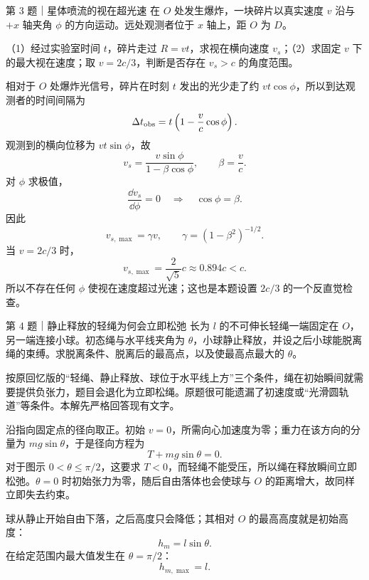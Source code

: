 \begin{problem}{第 3 题｜星体喷流的视在超光速}
在 $O$ 处发生爆炸，一块碎片以真实速度 $v$ 沿与 $+x$ 轴夹角 $\phi$ 的方向运动。远处观测者位于 $x$ 轴上，距 $O$ 为 $D$。

（1）经过实验室时间 $t$，碎片走过 $R=vt$，求视在横向速度 $v_s$；（2）求固定 $v$ 下的最大视在速度；取 $v=2c/3$，判断是否存在 $v_s>c$ 的角度范围。
\FigSuperluminal
\end{problem}
\begin{solution}
相对于 $O$ 处爆炸光信号，碎片在时刻 $t$ 发出的光少走了约 $vt\cos\phi$，所以到达观测者的时间间隔为
\[
\Delta t_{\rm obs}=t\left(1-\frac vc\cos\phi\right).
\]
观测到的横向位移为 $vt\sin\phi$，故
\[
\boxed{v_s=\frac{v\sin\phi}{1-\beta\cos\phi}},
\qquad \beta=\frac vc.
\]
对 $\phi$ 求极值，
\[
\frac{\dd v_s}{\dd\phi}=0
\quad\Longrightarrow\quad
\cos\phi=\beta.
\]
因此
\[
\boxed{v_{s,\max}=\gamma v},
\qquad \gamma=(1-\beta^2)^{-1/2}.
\]
当 $v=2c/3$ 时，
\[
v_{s,\max}=\frac{2}{\sqrt5}c\approx0.894c<c.
\]
所以不存在任何 $\phi$ 使视在速度超过光速；这也是本题设置 $2c/3$ 的一个反直觉检查。
\end{solution}

\begin{problem}{第 4 题｜静止释放的轻绳为何会立即松弛}
长为 $l$ 的不可伸长轻绳一端固定在 $O$，另一端连接小球。初态绳与水平线夹角为 $\theta$，小球静止释放，并设之后小球能脱离绳的束缚。求脱离条件、脱离后的最高点，以及使最高点最大的 $\theta$。
\FigPendulumSlack
\end{problem}
\begin{identification}
按原回忆版的“轻绳、静止释放、球位于水平线上方”三个条件，绳在初始瞬间就需要提供负张力，题目会退化为立即松绳。原题很可能遗漏了初速度或“光滑圆轨道”等条件。本解先严格回答现有文字。
\end{identification}
\begin{solution}
沿指向固定点的径向取正。初始 $v=0$，所需向心加速度为零；重力在该方向的分量为 $mg\sin\theta$，于是径向方程为
\[
T+mg\sin\theta=0.
\]
对于图示 $0<\theta\le\pi/2$，这要求 $T<0$，而轻绳不能受压，所以绳在释放瞬间立即松弛。$\theta=0$ 时初始张力为零，随后自由落体也会使球与 $O$ 的距离增大，故同样立即失去约束。

球从静止开始自由下落，之后高度只会降低；其相对 $O$ 的最高高度就是初始高度：
\[
\boxed{h_m=l\sin\theta}.
\]
在给定范围内最大值发生在 $\theta=\pi/2$：
\[
\boxed{h_{m,\max}=l}.
\]
\end{solution}

